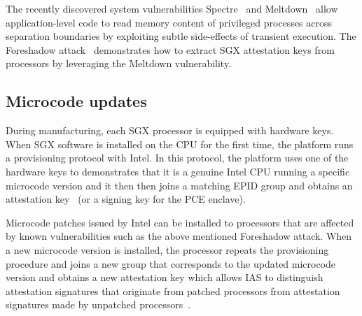 The recently discovered system vulnerabilities Spectre~\cite{Kocher2018spectre} and Meltdown~\cite{Lipp2018meltdown} allow application-level code to read memory content of privileged processes across separation boundaries by exploiting subtle side-effects of transient execution. The Foreshadow attack~\cite{foreshadow-usenix18} demonstrates how to extract SGX attestation keys from processors by leveraging the Meltdown vulnerability. 

\subsection{Microcode updates}
During manufacturing, each SGX processor is equipped with hardware keys. When SGX software is installed on the CPU for the first time, the platform runs a provisioning protocol with Intel. In this protocol, the platform uses one of the hardware keys to demonstrates that it is a genuine Intel CPU running a specific microcode version and it then then joins a matching EPID group and obtains an attestation key~\cite{epid_attestation} (or a signing key for the PCE enclave). 

Microcode patches issued by Intel can be installed to processors that are affected by known vulnerabilities such as the above mentioned Foreshadow attack. When a new microcode version is installed, the processor repeats the provisioning procedure and joins a new group that corresponds to the updated microcode version and obtains a new attestation key which allows IAS to distinguish attestation signatures that originate from patched processors from attestation signatures made by unpatched processors~\cite{epid_attestation}.